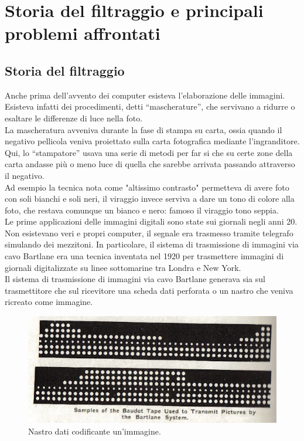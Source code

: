 \chapter{Storia del filtraggio e principali problemi affrontati}

\section{Storia del filtraggio}
Anche prima dell'avvento dei computer esisteva l'elaborazione delle immagini. Esisteva infatti dei procedimenti, detti “mascherature”, che servivano a ridurre o esaltare le differenze di luce nella foto.\\
La mascheratura avveniva durante la fase di stampa su carta, ossia quando il negativo pellicola veniva proiettato sulla carta fotografica mediante l’ingranditore.\\
\vspace{1em}
Qui, lo “stampatore” usava una serie di metodi per far si che su certe zone della carta andasse più o meno luce di quella che sarebbe arrivata passando attraverso il negativo.\\
Ad esempio la tecnica nota come "altissimo contrasto" permetteva di avere foto con soli bianchi e soli neri, il viraggio invece serviva a dare un tono di colore alla foto, che restava comunque un bianco e nero: famoso il viraggio tono seppia.
\\
\vspace{1em} 
Le prime applicazioni delle immagini digitali sono state sui giornali negli anni 20. Non esistevano veri e propri computer, il segnale era trasmesso tramite telegrafo simulando dei mezzitoni.
In particolare, il sistema di trasmissione di immagini via cavo Bartlane era una tecnica inventata nel 1920 per trasmettere immagini di giornali digitalizzate su linee sottomarine tra Londra e New York.
\\
\newpage
Il sistema di trasmissione di immagini via cavo Bartlane generava sia sul trasmettitore che sul ricevitore una scheda dati perforata o un nastro che veniva ricreato come immagine. 

\begin{figure}[htb] \centering
\includegraphics[scale=0.7, trim = 0 1.1cm 0 0, clip]{Pictures/nastro Bartlane.jpg}
\caption{Nastro dati codificante un'immagine.}\label{fig:figura}
\end{figure}

